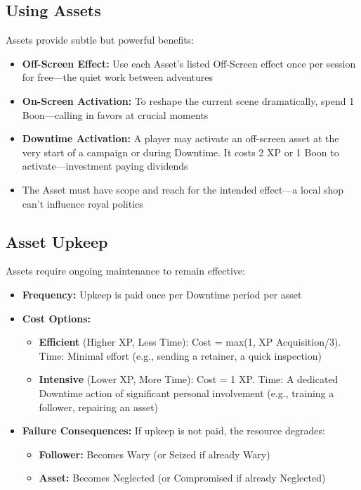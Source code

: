 \subsection*{Using Assets}

Assets provide subtle but powerful benefits:

\begin{itemize}
    \item \textbf{Off-Screen Effect:} Use each Asset's listed Off-Screen effect once per session for free—the quiet work between adventures
    \item \textbf{On-Screen Activation:} To reshape the current scene dramatically, spend 1 Boon—calling in favors at crucial moments
    \item \textbf{Downtime Activation:} A player may activate an off-screen asset at the very start of a campaign or during Downtime. It costs 2 XP or 1 Boon to activate—investment paying dividends
    \item The Asset must have scope and reach for the intended effect—a local shop can't influence royal politics
\end{itemize}

\subsection*{Asset Upkeep}

Assets require ongoing maintenance to remain effective:

\begin{itemize}
    \item \textbf{Frequency:} Upkeep is paid once per Downtime period per asset
    \item \textbf{Cost Options:}
        \begin{itemize}
            \item \textbf{Efficient} (Higher XP, Less Time): Cost = max(1, XP Acquisition/3). Time: Minimal effort (e.g., sending a retainer, a quick inspection)
            \item \textbf{Intensive} (Lower XP, More Time): Cost = 1 XP. Time: A dedicated Downtime action of significant personal involvement (e.g., training a follower, repairing an asset)
        \end{itemize}
    \item \textbf{Failure Consequences:} If upkeep is not paid, the resource degrades:
        \begin{itemize}
            \item \textbf{Follower:} Becomes Wary (or Seized if already Wary)
            \item \textbf{Asset:} Becomes Neglected (or Compromised if already Neglected)
        \end{itemize}
\end{itemize}

